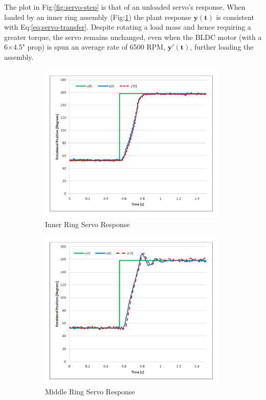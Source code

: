 \par
The plot in Fig:\ref{fig:servo-step} is that of an unloaded servo's response. When loaded by an inner ring assembly (Fig:\ref{fig:servo-step-inner}) the plant response {\color{Blue}$\mathbf{y(t)}$} is consistent with Eq:\ref{eq:servo-transfer}. Despite rotating a load mass and hence requiring a greater torque, the servo remains unchanged, even when the BLDC motor (with a 6$\times$4.5" prop) is spun an average rate of 6500 RPM, {\color{Red}$\mathbf{y'(t)}$}, further loading the assembly.
\begin{figure}[hbtp]
\begin{subfigure}{0.5\textwidth}
\centering
\includegraphics[width=0.98\textwidth]{graphs/servo-step-inner}
\caption{Inner Ring Servo Response}
\label{fig:servo-step-inner}
\end{subfigure}
\begin{subfigure}{0.5\textwidth}
\centering
\includegraphics[width=0.98\textwidth]{graphs/servo-step-middle}
\caption{Middle Ring Servo Response}
\label{fig:servo-step-middle}
\end{subfigure}
\caption{}
\end{figure}
